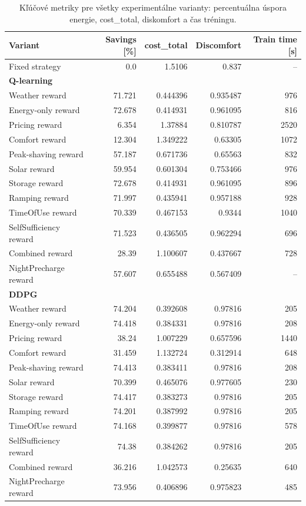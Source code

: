 \documentclass[conference]{IEEEtran}
\begin{document}
\begin{table}[t]
\centering
\small
\caption{Kľúčové metriky pre všetky experimentálne varianty: percentuálna úspora energie, cost\_total, diskomfort a čas tréningu.}
\label{tab:variant_summary}
\begin{tabular}{lrrrr}
\hline
Variant & Savings [\%] & cost\_total & Discomfort & Train time [s] \\
\hline
Fixed strategy & 0.0 & 1.5106 & 0.837 & -- \\
\hline
\multicolumn{5}{l}{\textbf{Q-learning}} \\
Weather reward & 71.721 & 0.444396 & 0.935487 & 976 \\
Energy-only reward & 72.678 & 0.414931 & 0.961095 & 816 \\
Pricing reward & 6.354 & 1.37884 & 0.810787 & 2520 \\
Comfort reward & 12.304 & 1.349222 & 0.63305 & 1072 \\
Peak-shaving reward & 57.187 & 0.671736 & 0.65563 & 832 \\
Solar reward & 59.954 & 0.601304 & 0.753466 & 976 \\
Storage reward & 72.678 & 0.414931 & 0.961095 & 896 \\
Ramping reward & 71.997 & 0.435941 & 0.957188 & 928 \\
TimeOfUse reward & 70.339 & 0.467153 & 0.9344 & 1040 \\
SelfSufficiency reward & 71.523 & 0.436505 & 0.962294 & 696 \\
Combined reward & 28.39 & 1.100607 & 0.437667 & 728 \\
NightPrecharge reward & 57.607 & 0.655488 & 0.567409 & -- \\
\hline
\multicolumn{5}{l}{\textbf{DDPG}} \\
Weather reward & 74.204 & 0.392608 & 0.97816 & 205 \\
Energy-only reward & 74.418 & 0.384331 & 0.97816 & 208 \\
Pricing reward & 38.24 & 1.007229 & 0.657596 & 1440 \\
Comfort reward & 31.459 & 1.132724 & 0.312914 & 648 \\
Peak-shaving reward & 74.413 & 0.383411 & 0.97816 & 208 \\
Solar reward & 70.399 & 0.465076 & 0.977605 & 230 \\
Storage reward & 74.417 & 0.383273 & 0.97816 & 205 \\
Ramping reward & 74.201 & 0.387992 & 0.97816 & 205 \\
TimeOfUse reward & 74.168 & 0.399877 & 0.97816 & 578 \\
SelfSufficiency reward & 74.38 & 0.384262 & 0.97816 & 205 \\
Combined reward & 36.216 & 1.042573 & 0.25635 & 640 \\
NightPrecharge reward & 73.956 & 0.406896 & 0.975823 & 485 \\
\hline
\end{tabular}
\end{table}
\end{document}
